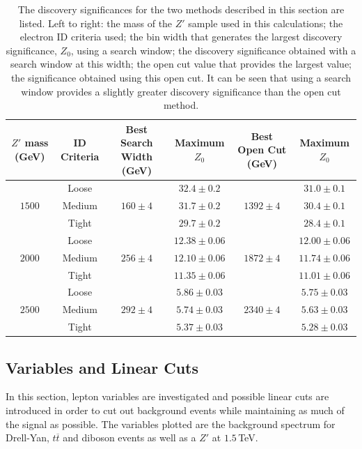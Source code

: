 \documentclass{article}
\begin{document}
\begin{table}[h!t]
\label{table:discoverySignificance}
\centering
\caption{The discovery significances for the two methods described in this section are listed. Left to right: the mass of the $Z'$ sample used in this calculations; the electron ID criteria used; the bin width that generates the largest discovery significance, $Z_0$, using a search window; the discovery significance obtained with a search window at this width; the open cut value that provides the largest value; the significance obtained using this open cut. It can be seen that using a search window provides a slightly greater discovery significance than the open cut method.}
\begin{tabular}{ |c|c|c|c|c|c| } 
\hline
$Z'$ mass (GeV) &  ID Criteria & Best Search Width (GeV) & Maximum $Z_0$ & Best Open Cut (GeV) &Maximum $Z_0$\\
\hline
\multirow{3}{*}{$1500$}  & Loose & \multirow{3}{*}{$160\pm4$}& $32.4\pm0.2$ & \multirow{3}{*}{$1392\pm4$} &$31.0\pm0.1$ \\\cline{2-2}\cline{4-4}\cline{6-6}
& Medium  & & $31.7\pm0.2$ & & $30.4\pm0.1$\\\cline{2-2}\cline{4-4}\cline{6-6}
& Tight &  & $29.7\pm0.2$ & & $28.4\pm0.1$\\\hline
\multirow{3}{*}{$2000$} & Loose & \multirow{3}{*}{$256\pm4$}& $12.38\pm0.06$ & \multirow{3}{*}{$1872\pm4$} & $12.00\pm0.06$\\\cline{2-2}\cline{4-4}\cline{6-6}
&  Medium & & $12.10\pm0.06$ & & $11.74\pm0.06$ \\\cline{2-2}\cline{4-4}\cline{6-6}
&  Tight & & $11.35\pm0.06$ & & $11.01\pm0.06$\\\hline
\multirow{3}{*}{$2500$} &  Loose & \multirow{3}{*}{$292\pm4$}& $5.86\pm0.03$ & \multirow{3}{*}{$2340\pm4$} & $5.75\pm0.03$ \\\cline{2-2}\cline{4-4}\cline{6-6}
&  Medium & & $5.74\pm0.03$ & & $5.63\pm0.03$\\\cline{2-2}\cline{4-4}\cline{6-6}
&  Tight  & & $5.37\pm0.03$ & & $5.28\pm0.03$\\\hline
\end{tabular}
\end{table}

\subsection{Variables and Linear Cuts}
\label{sec:MCA_variables}

In this section, lepton variables are investigated and possible linear cuts are introduced in order to cut out background events while maintaining as much of the signal as possible. The variables plotted are the background spectrum for Drell-Yan, $t\overline{t}$ and diboson events as well as a $Z'$ at $1.5\,$TeV.
\end{document}
